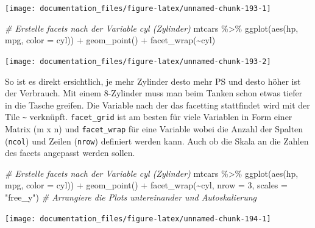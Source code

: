 \documentclass[
]{article}
\newenvironment{Shaded}{\begin{snugshade}}{\end{snugshade}}
\newcommand{\AttributeTok}[1]{\textcolor[rgb]{0.77,0.63,0.00}{#1}}
\newcommand{\CommentTok}[1]{\textcolor[rgb]{0.56,0.35,0.01}{\textit{#1}}}
\newcommand{\DecValTok}[1]{\textcolor[rgb]{0.00,0.00,0.81}{#1}}
\newcommand{\FunctionTok}[1]{\textcolor[rgb]{0.00,0.00,0.00}{#1}}
\newcommand{\NormalTok}[1]{#1}
\newcommand{\SpecialCharTok}[1]{\textcolor[rgb]{0.00,0.00,0.00}{#1}}
\newcommand{\StringTok}[1]{\textcolor[rgb]{0.31,0.60,0.02}{#1}}
\begin{document}
\begin{center}\texttt{[image: documentation\_files/figure-latex/unnamed-chunk-193-1]} \end{center}

\begin{Shaded}
\begin{Highlighting}[]
\CommentTok{\# Erstelle facets nach der Variable cyl (Zylinder)}
\NormalTok{mtcars }\SpecialCharTok{\%\textgreater{}\%}
  \FunctionTok{ggplot}\NormalTok{(}\FunctionTok{aes}\NormalTok{(hp, mpg, }\AttributeTok{color =}\NormalTok{ cyl)) }\SpecialCharTok{+}
  \FunctionTok{geom\_point}\NormalTok{() }\SpecialCharTok{+}
  \FunctionTok{facet\_wrap}\NormalTok{(}\SpecialCharTok{\textasciitilde{}}\NormalTok{cyl)}
\end{Highlighting}
\end{Shaded}

\begin{center}\texttt{[image: documentation\_files/figure-latex/unnamed-chunk-193-2]} \end{center}

So ist es direkt ersichtlich, je mehr Zylinder desto mehr PS und desto höher ist der Verbrauch. Mit einem 8-Zylinder muss man beim Tanken schon etwas tiefer in die Tasche greifen. Die Variable nach der das facetting stattfindet wird mit der Tile \texttt{\textasciitilde{}} verknüpft. \texttt{facet\_grid} ist am besten für viele Variablen in Form einer Matrix (m x n) und \texttt{facet\_wrap} für eine Variable wobei die Anzahl der Spalten (\texttt{ncol}) und Zeilen (\texttt{nrow}) definiert werden kann. Auch ob die Skala an die Zahlen des facets angepasst werden sollen.

\begin{Shaded}
\begin{Highlighting}[]
\CommentTok{\# Erstelle facets nach der Variable cyl (Zylinder)}
\NormalTok{mtcars }\SpecialCharTok{\%\textgreater{}\%}
  \FunctionTok{ggplot}\NormalTok{(}\FunctionTok{aes}\NormalTok{(hp, mpg, }\AttributeTok{color =}\NormalTok{ cyl)) }\SpecialCharTok{+}
  \FunctionTok{geom\_point}\NormalTok{() }\SpecialCharTok{+}
  \FunctionTok{facet\_wrap}\NormalTok{(}\SpecialCharTok{\textasciitilde{}}\NormalTok{cyl, }\AttributeTok{nrow =} \DecValTok{3}\NormalTok{, }\AttributeTok{scales =} \StringTok{"free\_y"}\NormalTok{) }\CommentTok{\# Arrangiere die Plots untereinander und Autoskalierung}
\end{Highlighting}
\end{Shaded}

\begin{center}\texttt{[image: documentation\_files/figure-latex/unnamed-chunk-194-1]} \end{center}
\end{document}

